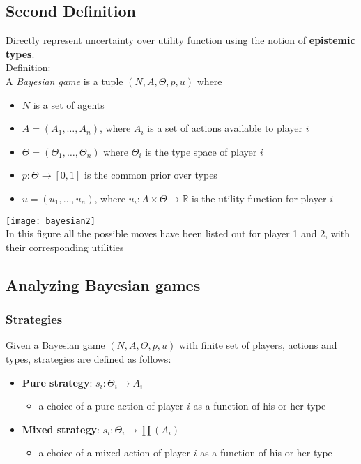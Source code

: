 \subsection{Second Definition}

Directly represent uncertainty over utility function using the notion of \textbf{epistemic types}.\\
Definition:\\
 A  \textit{Bayesian game} is a tuple $(N, A, \Theta, p, u)$ where
\begin{itemize}
\item $N$ is a set of agents
\item $A = (A_1, \dots, A_n)$, where $A_i$ is a set of actions available to player $i$
\item $\Theta = (\Theta_1, \dots , \Theta_n)$ where $\Theta_i$ is the type space of player $i$
\item $p: \Theta \to [0,1] $ is the common prior over types
\item $u = (u_1, \dots, u_n)$,  where $u_i: A \times \Theta \to \mathbb{R}$ is the utility function for player $i$
\end{itemize}
 \begin{center}
\texttt{[image: bayesian2]}\\
In this figure all the possible moves have been listed out for player 1 and 2, with their corresponding utilities
\end{center}

\subsection{Analyzing Bayesian games}
\subsubsection{Strategies}
Given a Bayesian game $(N, A, \Theta, p, u)$ with finite set of players, actions and types, strategies are defined as follows:
\begin{itemize}
\item \textbf{Pure strategy}: $s_i: \Theta_i \to A_i$
	\begin{itemize}
	\item a choice of a pure action of player $i$ as a function of his or her type
	\end{itemize}
\item \textbf{Mixed strategy}: $s_i: \Theta_i \to \prod(A_i)$
	\begin{itemize}
	\item a choice of a mixed action of player $i$ as a function of his or her type
	\end{itemize}
\end{itemize}
